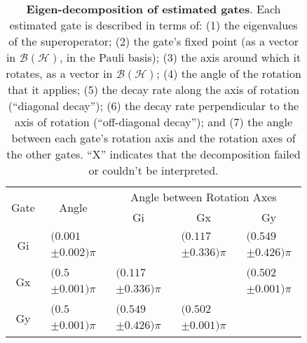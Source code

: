 \documentclass{article}[11pt]
\begin{document}
\begin{table}[h]
\begin{center}
\vspace{2em}
\begin{tabular}[l]{|c|c|c|c|c|}
\hline
\multirow{2}{*}{Gate} & \multirow{2}{*}{Angle} & \multicolumn{3}{c|}{Angle between Rotation Axes} \\ \cline{3-5}
 & & Gi & Gx & Gy \\ \hline
Gi & $ \begin{array}{c}(0.001 \\ \pm 0.002)\pi \end{array} $ &  & $ \begin{array}{c}(0.117 \\ \pm 0.336)\pi \end{array} $ & $ \begin{array}{c}(0.549 \\ \pm 0.426)\pi \end{array} $ \\ \hline
Gx & $ \begin{array}{c}(0.5 \\ \pm 0.001)\pi \end{array} $ & $ \begin{array}{c}(0.117 \\ \pm 0.336)\pi \end{array} $ &  & $ \begin{array}{c}(0.502 \\ \pm 0.001)\pi \end{array} $ \\ \hline
Gy & $ \begin{array}{c}(0.5 \\ \pm 0.001)\pi \end{array} $ & $ \begin{array}{c}(0.549 \\ \pm 0.426)\pi \end{array} $ & $ \begin{array}{c}(0.502 \\ \pm 0.001)\pi \end{array} $ &  \\ \hline
\end{tabular}

\caption{\textbf{Eigen-decomposition of estimated gates}.  Each estimated gate is described in terms of: (1) the eigenvalues of the superoperator; (2) the gate's fixed point (as a vector in $\mathcal{B}(\mathcal{H})$, in the Pauli basis); (3)  the axis around which it rotates, as a vector in $\mathcal{B}(\mathcal{H})$; (4) the angle of the rotation that it applies; (5) the decay rate along the axis of rotation (``diagonal decay''); (6) the decay rate perpendicular to the axis of rotation (``off-diagonal decay''); and (7) the angle between each gate's rotation axis and the rotation axes of the other gates.  ``X'' indicates that the decomposition failed or couldn't be interpreted. \label{bestGatesetDecompTable}}
\end{center}
\end{table}
\end{document}
